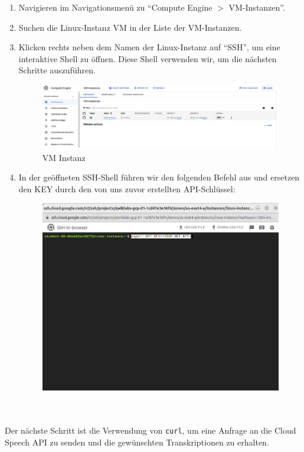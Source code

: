 \documentclass[12pt,a4paper]{article}
\begin{document}
\begin{enumerate}
	\item Navigieren im Navigationsmenü zu \enquote{Compute Engine $>$ VM-Instanzen}.
	
	\item Suchen die Linux-Instanz VM in der Liste der VM-Instanzen. 
	
	\item Klicken rechts neben dem Namen der Linux-Instanz auf \enquote{SSH}, um eine interaktive Shell zu öffnen. Diese Shell verwenden wir, um die nächsten Schritte auszuführen.

\begin{figure}[h!]
	\centering
	\includegraphics[width=0.9\linewidth]{../images/VM_Instances}
	\caption{VM Instanz}
	\label{fig:vminstances}
\end{figure}

	\item In der geöffneten SSH-Shell führen wir den folgenden Befehl aus und ersetzen den KEY durch den von uns zuvor erstellten API-Schlüssel:

\begin{figure}[h!]
	\centering
	\includegraphics[width=0.8\linewidth]{../images/SSH}
	\label{fig:ssh}
\end{figure}
\end{enumerate}
\ \\ \\
Der nächste Schritt ist die Verwendung von \texttt{curl}, um eine Anfrage an die Cloud Speech API zu senden und die gewünschten Transkriptionen zu erhalten. 
\end{document}
